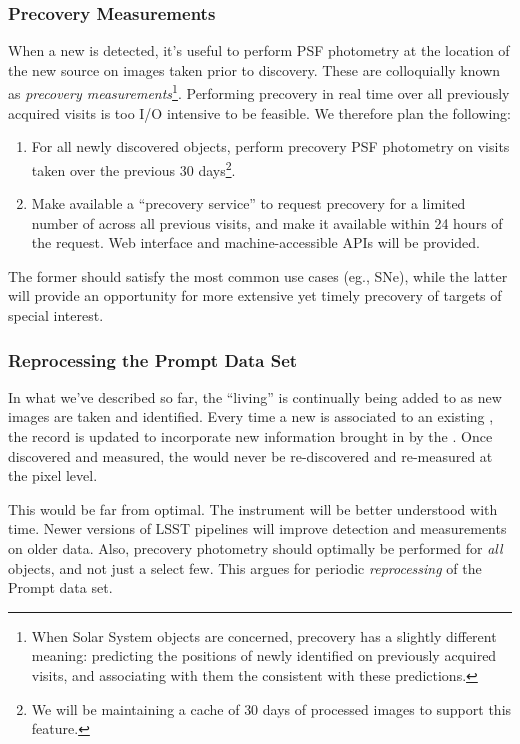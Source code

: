 \documentclass[SE,lsstdraft,toc]{lsstdoc}
\begin{document}
\subsubsection{Precovery Measurements}

When a new \DIASource is detected, it's useful to perform PSF photometry at the location of the new source on images taken prior to discovery. These are colloquially known as \emph{precovery measurements}\footnote{When Solar System objects are concerned, precovery has a slightly different meaning: predicting the positions of newly identified \SSObjects on previously acquired visits, and associating with them the \DIASources consistent with these predictions.}. Performing precovery in real time over all previously acquired visits is too I/O intensive to be feasible. We therefore plan the following:
\begin{enumerate}
\item For all newly discovered objects, perform precovery PSF photometry on visits taken over the previous 30 days\footnote{We will be maintaining a cache of $30$ days of processed images to support this feature.}.
\item Make available a ``precovery service'' to request precovery for a limited number of \DIASources across all previous visits, and make it available within 24 hours of the request. Web interface and machine-accessible APIs will be provided.
\end{enumerate}

The former should satisfy the most common use cases (eg., SNe), while the latter will provide an opportunity for more extensive yet timely precovery of targets of special interest.

\subsubsection{Reprocessing the Prompt Data Set}
\label{sec:l1dbreproc}

In what we've described so far, the ``living'' \DB is continually being added to as new images are taken and \DIASources identified. Every time a new \DIASource is associated to an existing \DIAObject, the \DIAObject record is updated to incorporate new information brought in by the \DIASource. Once discovered and measured, the \DIASources would never be re-discovered and re-measured at the pixel level.

This would be far from optimal. The instrument will be better understood with time. Newer versions of LSST pipelines will improve detection and measurements on older data. Also, precovery photometry should optimally be performed for \emph{all} objects, and not just a select few. This argues for periodic \emph{reprocessing} of the Prompt data set. 
\end{document}
